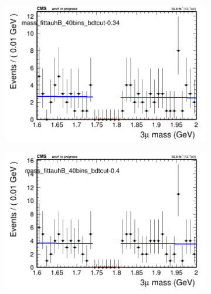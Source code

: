 \begin{figure}[H]
\begin{subfigure}{0.2\textwidth}
        \caption{}
    \end{subfigure}
    \begin{subfigure}{0.2\textwidth}
        \includegraphics[width=\textwidth]{power_law/plots/tauhB/massfit_tauhB_40bins_bdtcut-0.34.png}
        \caption{}
    \end{subfigure}
    \begin{subfigure}{0.2\textwidth}
        \includegraphics[width=\textwidth]{power_law/plots/tauhB/massfit_tauhB_40bins_bdtcut-0.4.png}
        \caption{}
    \end{subfigure}
    \begin{subfigure}{0.2\textwidth}

\end{subfigure}
\end{figure}
